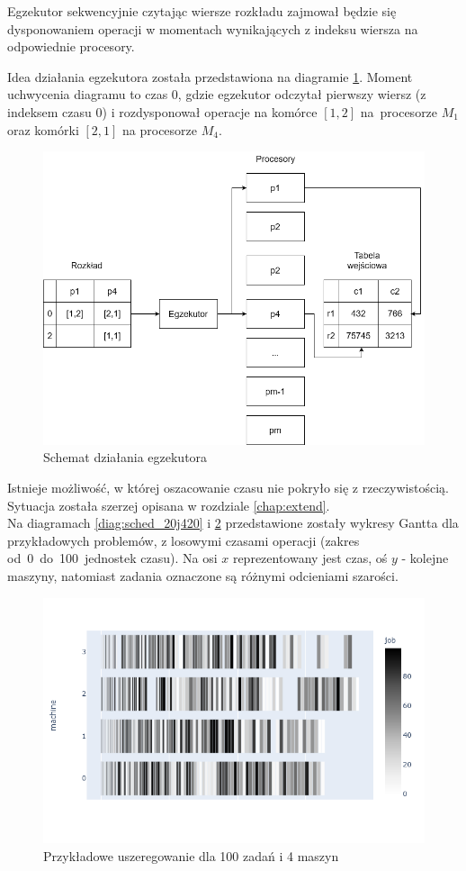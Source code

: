 \documentclass[brudnopis]{xmgr}
\begin{document}
Egzekutor sekwencyjnie czytając wiersze rozkładu zajmował będzie się dysponowaniem operacji w momentach wynikających z indeksu wiersza na odpowiednie procesory.
\medskip

Idea działania egzekutora została przedstawiona na diagramie \ref{diag:executor}. Moment uchwycenia diagramu 
to czas 0, gdzie egzekutor odczytał pierwszy wiersz (z indeksem czasu 0) i rozdysponował operacje na komórce $[1,2]$ na~procesorze $M_1$ oraz komórki $[2,1]$ na procesorze $M_4$.
\medskip

\begin{figure}[!tbh]
\centering
\includegraphics[width=.8\hsize]{fig/executor.png}
\caption{Schemat działania egzekutora\label{diag:executor}}
\end{figure}
\medskip

Istnieje możliwość, w której oszacowanie czasu nie pokryło się z rzeczywistością. Sytuacja została szerzej opisana w rozdziale \ref{chap:extend}.\\

Na diagramach \ref{diag:sched_20j420} i \ref{diag:sched_100j4m} przedstawione zostały wykresy Gantta dla przykładowych problemów, z losowymi czasami operacji (zakres od~0~do~100~jednostek czasu). Na osi $x$ reprezentowany jest czas, oś $y$ - kolejne maszyny, natomiast zadania oznaczone są różnymi odcieniami szarości.

\begin{figure}[!tbh]
\centering
\includegraphics[width=.8\hsize]{fig/newplot_trim100j4m.png}
\caption{Przykładowe uszeregowanie dla 100 zadań i 4 maszyn\label{diag:sched_100j4m}}
\end{figure}
\medskip
\end{document}
